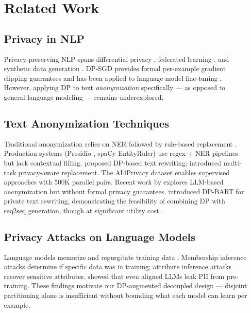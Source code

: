 \documentclass[9pt]{article}
\begin{document}
\section{Related Work}

\subsection{Privacy in NLP}
Privacy-preserving NLP spans differential privacy \cite{dwork2014algorithmic}, federated learning \cite{mcmahan2017communication}, and synthetic data generation \cite{yoon2020anonymization}. DP-SGD \cite{abadi2016deep} provides formal per-example gradient clipping guarantees and has been applied to language model fine-tuning \cite{yu2022differentially, li2022large_dp}. However, applying DP to text \textit{anonymization} specifically --- as opposed to general language modeling --- remains underexplored.

\subsection{Text Anonymization Techniques}
Traditional anonymization relies on NER followed by rule-based replacement \cite{dernoncourt2017identification}. Production systems (Presidio \cite{presidio2023}, spaCy EntityRuler) use regex + NER pipelines but lack contextual filling. \citet{weggenmann2022dp} proposed DP-based text rewriting; \citet{papadopoulou2022muted} introduced multi-task privacy-aware replacement. The AI4Privacy dataset \cite{pilán2022ai4privacy} enables supervised approaches with 500K parallel pairs. Recent work by \citet{staab2024llm_privacy} explores LLM-based anonymization but without formal privacy guarantees. \citet{igamberdiev2023dp_bart} introduced DP-BART for private text rewriting, demonstrating the feasibility of combining DP with seq2seq generation, though at significant utility cost.

\subsection{Privacy Attacks on Language Models}
Language models memorize and regurgitate training data \cite{carlini2021extracting, carlini2022quantifying}. Membership inference attacks \cite{shokri2017membership} determine if specific data was in training; attribute inference attacks \cite{song2019auditing} recover sensitive attributes. \citet{lukas2023analyzing} showed that even aligned LLMs leak PII from pre-training. These findings motivate our DP-augmented decoupled design --- disjoint partitioning alone is insufficient without bounding what each model can learn per example.
\end{document}
